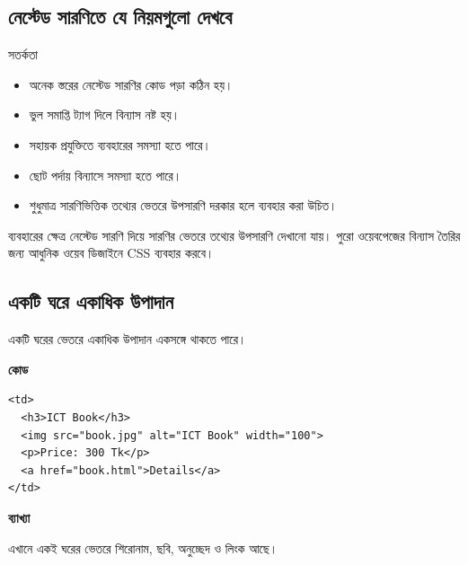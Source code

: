 \subsection{নেস্টেড সারণিতে যে নিয়মগুলো দেখবে}

\begin{mistakebox}{সতর্কতা}
\begin{itemize}
\item অনেক স্তরের নেস্টেড সারণির কোড পড়া কঠিন হয়।
\item ভুল সমাপ্তি ট্যাগ দিলে বিন্যাস নষ্ট হয়।
\item সহায়ক প্রযুক্তিতে ব্যবহারের সমস্যা হতে পারে।
\item ছোট পর্দায় বিন্যাসে সমস্যা হতে পারে।
\item শুধুমাত্র সারণিভিত্তিক তথ্যের ভেতরে উপসারণি দরকার হলে ব্যবহার করা উচিত।
\end{itemize}
\end{mistakebox}

\begin{boardbox}{ব্যবহারের ক্ষেত্র}
নেস্টেড সারণি দিয়ে সারণির ভেতরে তথ্যের উপসারণি দেখানো যায়। পুরো ওয়েবপেজের বিন্যাস তৈরির জন্য আধুনিক ওয়েব ডিজাইনে CSS ব্যবহার করবে।
\end{boardbox}

\subsection{একটি ঘরে একাধিক উপাদান}

একটি ঘরের ভেতরে একাধিক উপাদান একসঙ্গে থাকতে পারে।

\par\noindent
\begin{minipage}[t]{.54\linewidth}\vspace{0pt}\small
\textbf{\color{chFourTeal}কোড}\par
\begin{verbatim}
<td>
  <h3>ICT Book</h3>
  <img src="book.jpg" alt="ICT Book" width="100">
  <p>Price: 300 Tk</p>
  <a href="book.html">Details</a>
</td>
\end{verbatim}
\par\smallskip
\end{minipage}\hfill
\begin{minipage}[t]{.42\linewidth}\vspace{0pt}\small
\textbf{\color{chFourTeal}ব্যাখ্যা}\par
এখানে একই ঘরের ভেতরে শিরোনাম, ছবি, অনুচ্ছেদ ও লিংক আছে।
\end{minipage}\par
